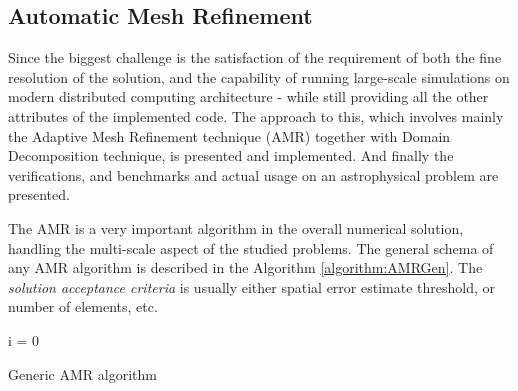 \documentclass[journal,transmag]{IEEEtran}
\begin{document}
\subsection*{Automatic Mesh Refinement}
Since the biggest challenge is the satisfaction of the requirement of both the fine resolution of the solution, and the capability of running large-scale simulations on modern distributed computing architecture - while still providing all the other attributes of the implemented code. The approach to this, which involves mainly the Adaptive Mesh Refinement technique (AMR) together with Domain Decomposition technique, is presented and implemented. And finally the verifications, and benchmarks and actual usage on an astrophysical problem are presented.

The AMR is a very important algorithm in the overall numerical solution, handling the multi-scale aspect of the studied problems. The general schema of any AMR algorithm is described in the Algorithm \ref{algorithm:AMRGen}. The \textit{solution acceptance criteria} is usually either spatial error estimate threshold, or number of elements, etc.
\ \\
\begin{algorithm}
 i = 0\\
 \caption{Generic AMR algorithm}
\label{algorithm:AMRGen}
\end{algorithm}
\end{document}
